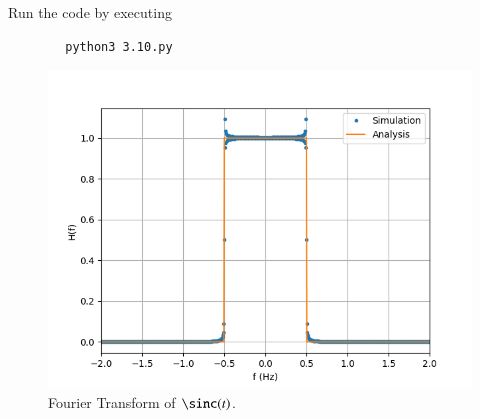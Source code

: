 \documentclass[journal,12pt,twocolumn]{IEEEtran}
\numberwithin{equation}{section}
\numberwithin{figure}{section}
\renewcommand\thesection{\arabic{section}}
\begin{document}
\begin{enumerate}[label=\thesection.\arabic*
,ref=\thesection.\theenumi]
	Run the code by executing
	\begin{lstlisting}
		python3 3.10.py
	\end{lstlisting}
\begin{figure}[!ht]
    \includegraphics[width=\columnwidth]{FIGURES/3.10.png}
    \caption{Fourier Transform of $\sinc(t)$.}
    \label{fig-3.10}
\end{figure}
\end{enumerate}
\end{document}
